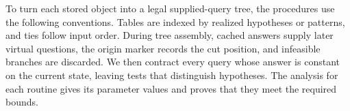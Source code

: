 To turn each stored object into a legal supplied-query tree, the
procedures use the following conventions. Tables are indexed by
realized hypotheses or patterns, and ties follow input order. During
tree assembly, cached answers supply later virtual questions, the
origin marker records the cut position, and infeasible branches are
discarded. We then contract every query whose answer is constant on
the current state, leaving tests that distinguish hypotheses. The
analysis for each routine gives its parameter values and proves that
they meet the required bounds.

